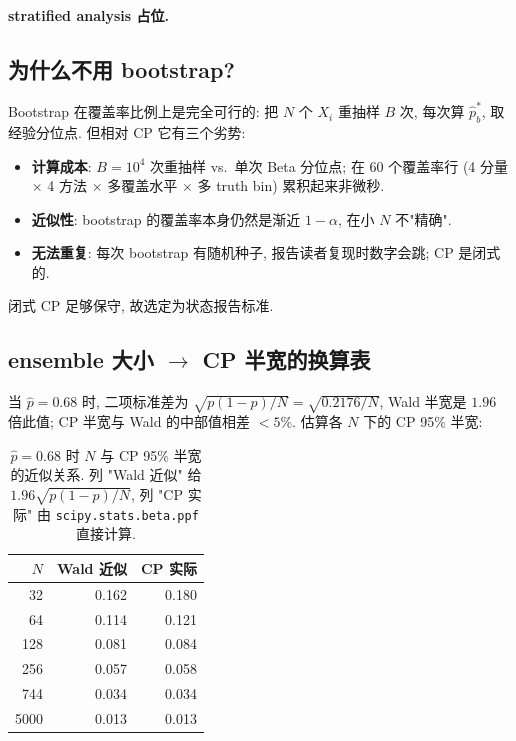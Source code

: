 \paragraph{stratified analysis 占位.}

\subsection{为什么不用 bootstrap?}
\label{sec:partIII:coverage_methodology:no_bootstrap}

Bootstrap 在覆盖率比例上是完全可行的: 把 $N$ 个 $X_i$ 重抽样 $B$ 次, 每次算 $\hat p^*_b$, 取经验分位点. 但相对 CP 它有三个劣势:

\begin{itemize}[nosep]
  \item \textbf{计算成本}: $B = 10^4$ 次重抽样 vs.\ 单次 Beta 分位点; 在 60 个覆盖率行 (4 分量 $\times$ 4 方法 $\times$ 多覆盖水平 $\times$ 多 truth bin) 累积起来非微秒.
  \item \textbf{近似性}: bootstrap 的覆盖率本身仍然是渐近 $1 - \alpha$, 在小 $N$ 不"精确".
  \item \textbf{无法重复}: 每次 bootstrap 有随机种子, 报告读者复现时数字会跳; CP 是闭式的.
\end{itemize}

闭式 CP 足够保守, 故选定为状态报告标准.

\subsection{ensemble 大小 $\to$ CP 半宽的换算表}
\label{sec:partIII:coverage_methodology:N_scaling}

当 $\hat p = 0.68$ 时, 二项标准差为 $\sqrt{p(1-p)/N} = \sqrt{0.2176/N}$, Wald 半宽是 $1.96$ 倍此值; CP 半宽与 Wald 的中部值相差 $< 5\%$. 估算各 $N$ 下的 CP 95\% 半宽:

\begin{table}[H]
\centering\small
\caption{$\hat p = 0.68$ 时 $N$ 与 CP 95\% 半宽的近似关系. 列 "Wald 近似" 给 $1.96\sqrt{p(1-p)/N}$, 列 "CP 实际" 由 \texttt{scipy.stats.beta.ppf} 直接计算.}
\label{tab:partIII:N_cp_halfw}
\begin{tabular}{rrr}
\toprule
$N$ & Wald 近似 & CP 实际 \\
\midrule
32   & 0.162 & 0.180 \\
64   & 0.114 & 0.121 \\
128  & 0.081 & 0.084 \\
256  & 0.057 & 0.058 \\
744  & 0.034 & 0.034 \\
5000 & 0.013 & 0.013 \\
\bottomrule
\end{tabular}
\end{table}

